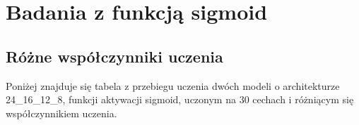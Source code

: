     \section{Badania z funkcją sigmoid}\label{sec:badaniaZFunkcjąSigmoid}

    \subsection{Różne współczynniki uczenia}\label{subsec:różneWspólczynnikiUczenia}

    Poniżej znajduje się tabela z przebiegu uczenia dwóch modeli o architekturze 24\_16\_12\_8, funkcji aktywacji sigmoid, uczonym na 30 cechach i różniącym się współczynnikiem uczenia.

